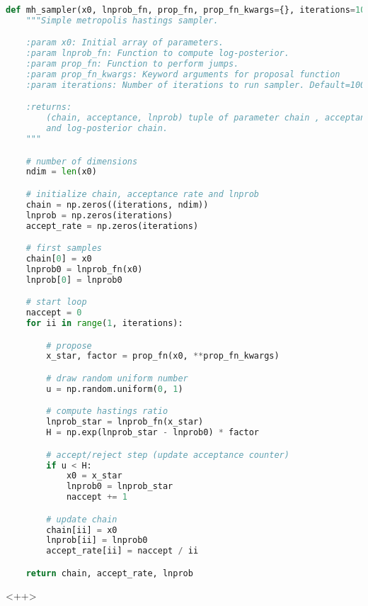 \begin{lstlisting}[language=Python]
def mh_sampler(x0, lnprob_fn, prop_fn, prop_fn_kwargs={}, iterations=100000):
    """Simple metropolis hastings sampler.

    :param x0: Initial array of parameters.
    :param lnprob_fn: Function to compute log-posterior.
    :param prop_fn: Function to perform jumps.
    :param prop_fn_kwargs: Keyword arguments for proposal function
    :param iterations: Number of iterations to run sampler. Default=100000

    :returns:
        (chain, acceptance, lnprob) tuple of parameter chain , acceptance rate
        and log-posterior chain.
    """

    # number of dimensions
    ndim = len(x0)

    # initialize chain, acceptance rate and lnprob
    chain = np.zeros((iterations, ndim))
    lnprob = np.zeros(iterations)
    accept_rate = np.zeros(iterations)

    # first samples
    chain[0] = x0
    lnprob0 = lnprob_fn(x0)
    lnprob[0] = lnprob0

    # start loop
    naccept = 0
    for ii in range(1, iterations):

        # propose
        x_star, factor = prop_fn(x0, **prop_fn_kwargs)

        # draw random uniform number
        u = np.random.uniform(0, 1)

        # compute hastings ratio
        lnprob_star = lnprob_fn(x_star)
        H = np.exp(lnprob_star - lnprob0) * factor

        # accept/reject step (update acceptance counter)
        if u < H:
            x0 = x_star
            lnprob0 = lnprob_star
            naccept += 1

        # update chain
        chain[ii] = x0
        lnprob[ii] = lnprob0
        accept_rate[ii] = naccept / ii

    return chain, accept_rate, lnprob

\end{lstlisting}<++>


		



